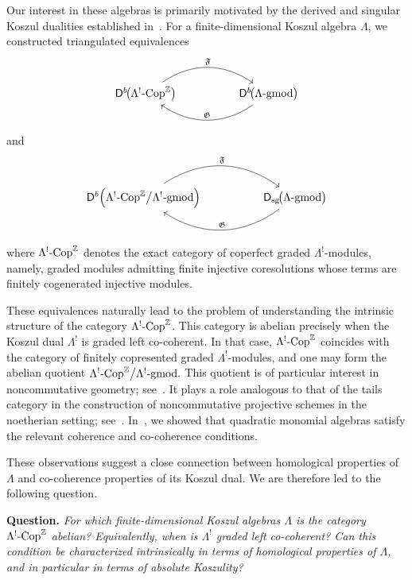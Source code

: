 \documentclass[11pt]{article}
\theoremstyle{definition}
\theoremstyle{remark}
\begin{document}
Our interest in these algebras is primarily motivated by the derived and singular Koszul dualities established in~\cite{4}. For a finite-dimensional Koszul algebra \(\Lambda\), we constructed triangulated equivalences
\[
\begin{tikzcd}[column sep=huge]
\mathsf{D}^{b}\!\bigl(
\Lambda^{!}\textup{-}\mathrm{Cop}^{\mathbb{Z}}
\bigr)
\arrow[r, bend left=35, "\mathfrak{F}"]
&
\mathsf{D}^{b}\!\bigl(
\Lambda\textup{-}\mathrm{gmod}
\bigr)
\arrow[l, bend left=35, "\mathfrak{G}"']
\end{tikzcd}
\]
and
\[
\begin{tikzcd}[column sep=huge]
\mathsf{D}^{b}\!\left(
\Lambda^{!}\textup{-}\mathrm{Cop}^{\mathbb{Z}}
\big/
\Lambda^{!}\textup{-}\mathrm{gmod}
\right)
\arrow[r, bend left=35, "\mathfrak{F}"]
&
\mathsf{D}_{\mathrm{sg}}\!\bigl(
\Lambda\textup{-}\mathrm{gmod}
\bigr)
\arrow[l, bend left=35, "\mathfrak{G}"']
\end{tikzcd}
\]
where \(\Lambda^{!}\textup{-}\mathrm{Cop}^{\mathbb{Z}}\) denotes the exact category of coperfect graded \(\Lambda^{!}\)-modules, namely, graded modules admitting finite injective coresolutions whose terms are finitely cogenerated injective modules.

These equivalences naturally lead to the problem of understanding the intrinsic structure of the category
\(\Lambda^{!}\textup{-}\mathrm{Cop}^{\mathbb{Z}}\).
This category is abelian precisely when the Koszul dual \(\Lambda^{!}\) is graded left co-coherent. In that case,
\(\Lambda^{!}\textup{-}\mathrm{Cop}^{\mathbb{Z}}\)
coincides with the category of finitely copresented graded \(\Lambda^{!}\)-modules, and one may form the abelian quotient
\(
\Lambda^{!}\textup{-}\mathrm{Cop}^{\mathbb{Z}}
\big/
\Lambda^{!}\textup{-}\mathrm{gmod}.
\)
This quotient is of particular interest in noncommutative geometry; see~\cite{22,23}. It plays a role analogous to that of the tails category in the construction of noncommutative projective schemes in the noetherian setting; see~\cite{2}. In~\cite{5}, we showed that quadratic monomial algebras satisfy the relevant coherence and co-coherence conditions.

These observations suggest a close connection between homological properties of \(\Lambda\) and co-coherence properties of its Koszul dual. We are therefore led to the following question.

\medskip

\noindent\textbf{Question.}
\emph{For which finite-dimensional Koszul algebras \(\Lambda\) is the category
\(\Lambda^{!}\textup{-}\mathrm{Cop}^{\mathbb{Z}}\) abelian?
Equivalently, when is \(\Lambda^{!}\) graded left co-coherent?
Can this condition be characterized intrinsically in terms of homological properties of \(\Lambda\), and in particular in terms of absolute Koszulity?}
\end{document}
